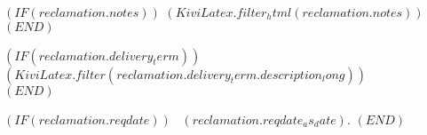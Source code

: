 \documentclass[paper=a4,fontsize=10pt]{scrartcl}
\begin{document}
\begin{letter}
$( IF (reclamation.notes) )$%
  $( KiviLatex.filter_html(reclamation.notes) )$%
  \medskip
$( END )$%

$( IF (reclamation.delivery_term) )$%
  \lieferung ~$( KiviLatex.filter(reclamation.delivery_term.description_long) )$\\
$( END )$%

$( IF (reclamation.reqdate) )$%
  \lieferungErfolgtAm ~$( reclamation.reqdate_as_date )$.
$( END )$%

\textit{\auftragpruefen}


\end{letter}
\end{document}
